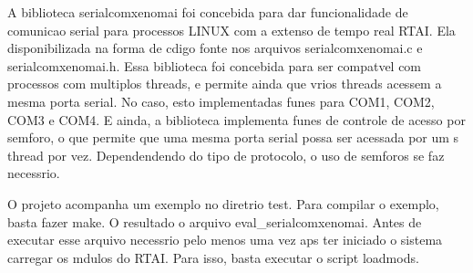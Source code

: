 A biblioteca serialcomxenomai foi concebida para dar funcionalidade de comunicao serial para processos LINUX com a extenso de tempo real RTAI. Ela disponibilizada na forma de cdigo fonte nos arquivos serialcomxenomai.c e serialcomxenomai.h. Essa biblioteca foi concebida para ser compatvel com processos com multiplos threads, e permite ainda que vrios threads acessem a mesma porta serial. No caso, esto implementadas funes para COM1, COM2, COM3 e COM4. E ainda, a biblioteca implementa funes de controle de acesso por semforo, o que permite que uma mesma porta serial possa ser acessada por um s thread por vez. Dependendendo do tipo de protocolo, o uso de semforos se faz necessrio.

O projeto acompanha um exemplo no diretrio test. Para compilar o exemplo, basta fazer make. O resultado o arquivo eval\_\-serialcomxenomai. Antes de executar esse arquivo necessrio pelo menos uma vez aps ter iniciado o sistema carregar os mdulos do RTAI. Para isso, basta executar o script loadmods. 
